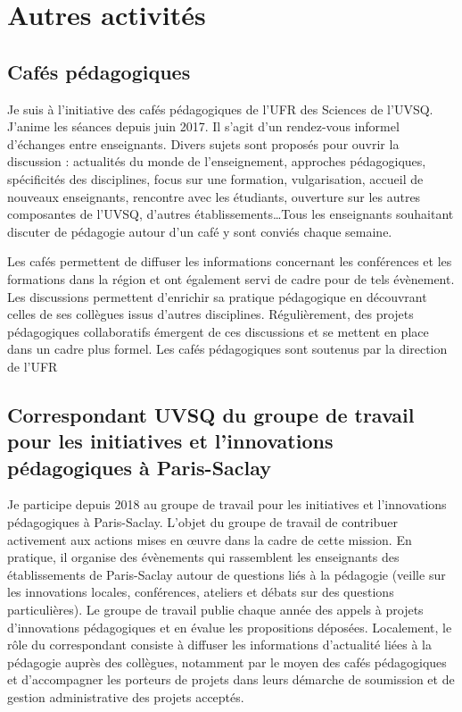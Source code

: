 \section{Autres activités}

	\subsection{Cafés pédagogiques}
Je suis à l'initiative des cafés pédagogiques de l'UFR des Sciences de l'UVSQ. J'anime les séances depuis juin 2017. Il s'agit d'un rendez-vous informel d'échanges entre enseignants. Divers sujets sont proposés pour ouvrir la discussion : actualités du monde de l'enseignement, approches pédagogiques, spécificités des disciplines, focus sur une formation, vulgarisation, accueil de nouveaux enseignants, rencontre avec les étudiants, ouverture sur les autres composantes de l'UVSQ, d'autres établissements\dots Tous les enseignants souhaitant discuter de pédagogie autour d'un café y sont conviés chaque semaine.

Les cafés permettent de diffuser les informations concernant les conférences et les formations dans la région et ont également servi de cadre pour de tels évènement. Les discussions permettent d'enrichir sa pratique pédagogique en découvrant celles de ses collègues issus d'autres disciplines. Régulièrement, des projets pédagogiques collaboratifs émergent de ces  discussions et se mettent en place dans un cadre plus formel.
Les cafés pédagogiques sont soutenus par la direction de l'UFR

	\subsection{Correspondant UVSQ du groupe de travail pour les initiatives et l'innovations pédagogiques à Paris-Saclay}


Je participe depuis 2018 au groupe de travail pour les initiatives et l'innovations pédagogiques à Paris-Saclay. L'objet du groupe de travail de contribuer activement aux actions mises en \oe uvre dans la cadre de cette mission. En pratique, il organise des évènements qui rassemblent les enseignants des établissements de Paris-Saclay autour de questions liés à la pédagogie (veille sur les innovations locales, conférences, ateliers et débats sur des questions particulières). Le groupe de travail publie chaque année des appels à projets d'innovations pédagogiques et en évalue les propositions déposées.
Localement, le rôle du correspondant consiste à diffuser les informations d'actualité liées à la pédagogie auprès des collègues, notamment par le moyen des cafés pédagogiques et d'accompagner les porteurs de projets dans leurs démarche de soumission et de gestion administrative des projets acceptés. 